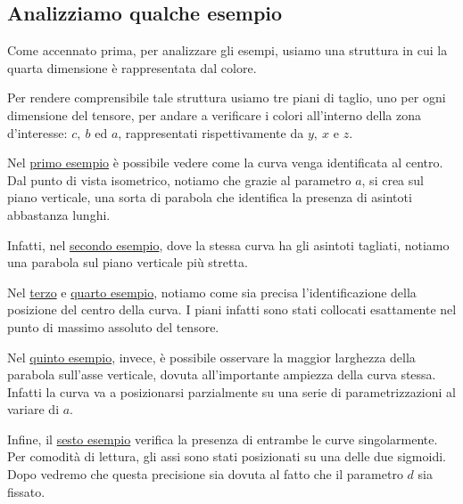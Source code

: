 \subsection{Analizziamo qualche esempio}
Come accennato prima, per analizzare gli esempi, usiamo una struttura in cui la quarta dimensione è rappresentata dal colore.\par
Per rendere comprensibile tale struttura usiamo tre piani di taglio, uno per ogni dimensione del tensore, per andare a verificare i colori all'interno della zona d'interesse: $c,\ b$ ed $a$, rappresentati rispettivamente da $y,\ x$ e $z$.\par
Nel \hyperref[fig:4D_ostinelli_1]{primo esempio} è possibile vedere come la curva venga identificata al centro. Dal punto di vista isometrico, notiamo che grazie al parametro $a$, si crea sul piano verticale, una sorta di parabola che identifica la presenza di asintoti abbastanza lunghi.\par
Infatti, nel \hyperref[fig:4D_ostinelli_2]{secondo esempio}, dove la stessa curva ha gli asintoti tagliati, notiamo una parabola sul piano verticale più stretta.\par
Nel \hyperref[fig:4D_ostinelli_3]{terzo} e \hyperref[fig:4D_ostinelli_4]{quarto esempio}, notiamo come sia precisa l'identificazione della posizione del centro della curva. I piani infatti sono stati collocati esattamente nel punto di massimo assoluto del tensore.\par
Nel \hyperref[fig:4D_ostinelli_5]{quinto esempio}, invece, è possibile osservare la maggior larghezza della parabola sull'asse verticale, dovuta all'importante ampiezza della curva stessa. Infatti la curva va a posizionarsi parzialmente su una serie di parametrizzazioni al variare di $a$.\par
Infine, il \hyperref[fig:4D_ostinelli_6]{sesto esempio} verifica la presenza di entrambe le curve singolarmente. Per comodità di lettura, gli assi sono stati posizionati su una delle due sigmoidi. Dopo vedremo che questa precisione sia dovuta al fatto che il parametro $d$ sia fissato.


